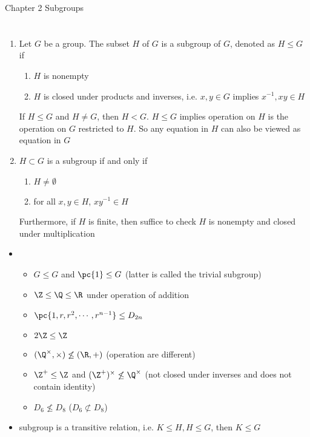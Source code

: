 \documentclass[11pt]{article}
\begin{document}
\begin{center}
    {\Huge Chapter 2 Subgroups}
\end{center}
\tableofcontents
\newpage


\section{}


\begin{definition*}
    \begin{enumerate}
        \item {} Let $G$ be a group. The subset $H$ of $G$ is a subgroup of $G$, denoted as $H\leq G$ if
        \begin{enumerate}
            \item $H$ is nonempty
            \item $H$ is closed under products and inverses, i.e. $x,y\in G$ implies $x^{-1},xy\in H$
        \end{enumerate}
        If $H\leq G$ and $H\neq G$, then $H < G$. $H\leq G$ implies operation on $H$ is the operation on $G$ restricted to $H$. So any equation in $H$ can also be viewed as equation in $G$
        \item {} $H \subset G$ is a subgroup if and only if
        \begin{enumerate}
            \item $H\neq \emptyset$
            \item for all $x,y\in H$, $xy^{-1} \in H$
        \end{enumerate}
        Furthermore, if $H$ is finite, then suffice to check $H$ is nonempty and closed under multiplication
    \end{enumerate}
    \begin{itemize}
        \item {}
        \begin{itemize}
            \item $G\leq G$ and $\pc{1}\leq G$ (latter is called the trivial subgroup)
            \item $\Z \leq \Q \leq \R$ under operation of addition 
            \item $\pc{1,r,r^2,\cdots,r^{n-1}} \leq D_{2n}$
            \item $2\Z \leq \Z$
            \item $(\Q^{\times}, \times) \not\leq (\R, +)$ (operation are different)
            \item $\Z^+ \leq \Z$ and $(\Z^+)^{\times} \not\leq \Q^{\times}$ (not closed under inverses and does not contain identity)
            \item $D_6 \not\leq D_8$ ($D_6 \not\subset D_8$)
        \end{itemize}
        \item {} subgroup is a transitive relation, i.e. $K\leq H, H\leq G$, then $K\leq G$ 
    \end{itemize}
\end{definition*}
 


\section{}
\end{document}
